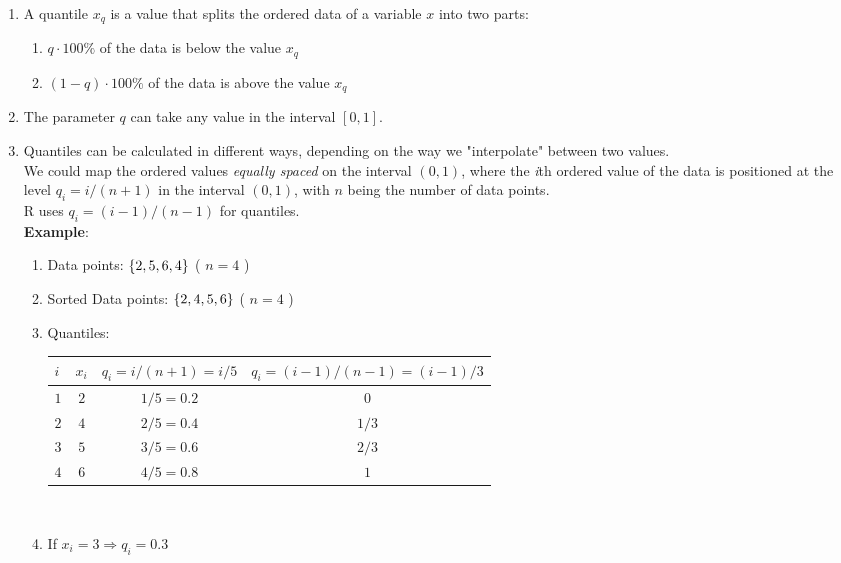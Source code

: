 \begin{enumerate}
    \item A quantile $x_q$ is a value that splits the ordered data of a variable $x$ into two parts: \hfill \cite{statistics/book/Statistics-for-Data-Scientists/Maurits-Kaptein}
    \begin{enumerate}
        \item $q \cdot 100\%$ of the data is below the value $x_q$

        \item $(1 - q) \cdot 100\%$ of the data is above the value $x_q$
    \end{enumerate}
    
    \item The parameter $q$ can take any value in the interval $[0, 1]$. \hfill \cite{statistics/book/Statistics-for-Data-Scientists/Maurits-Kaptein}

    \item Quantiles can be calculated in different ways, depending on the way we "interpolate" between two values. \hfill \cite{statistics/book/Statistics-for-Data-Scientists/Maurits-Kaptein} \\
    We could map the ordered values \textit{equally spaced} on the interval $(0, 1)$, where the \textit{i}th ordered value of the data is positioned at the level $q_i = {i}/{(n + 1)}$ in the interval $(0, 1)$, with $n$ being the number of data points. \hfill \cite{statistics/book/Statistics-for-Data-Scientists/Maurits-Kaptein} \\
    R uses $q_i = (i - 1)/(n - 1)$ for quantiles. \hfill \cite{statistics/book/Statistics-for-Data-Scientists/Maurits-Kaptein} \\
    \textbf{Example}: \hfill \cite{statistics/book/Statistics-for-Data-Scientists/Maurits-Kaptein}
    \begin{enumerate}
        \item Data points: $\left\{2, 5, 6, 4\right\}$ ( $n=4$ )
        \item Sorted Data points: $\left\{2, 4, 5, 6\right\}$ ( $n=4$ )
        \item Quantiles:\\[0.2cm]
        \begin{tabular}{|l|c|c|c|}
            \hline
            $i$ & $x_i$ & $q_i = i/(n+1) = i/5$ & $q_i = (i-1)/(n-1) = (i-1)/3$ \\ [0.1cm]
            \hline
            $1$ & $2$ & $1/5 = 0.2$ & $0$ \\
            $2$ & $4$ & $2/5 = 0.4$ & $1/3$ \\
            $3$ & $5$ & $3/5 = 0.6$ & $2/3$ \\
            $4$ & $6$ & $4/5 = 0.8$ & $1$ \\
            \hline
        \end{tabular}\\

        \item If $x_i = 3 \Rightarrow q_i = 0.3$
    \end{enumerate}
\end{enumerate}


